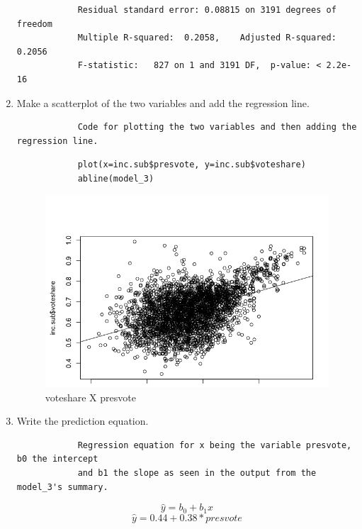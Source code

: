 \documentclass[12pt,letterpaper]{article}
\begin{document}
\begin{enumerate}
\begin{verbatim}
			Residual standard error: 0.08815 on 3191 degrees of freedom
			Multiple R-squared:  0.2058,	Adjusted R-squared:  0.2056
			F-statistic:   827 on 1 and 3191 DF,  p-value: < 2.2e-16
		\end{verbatim}
		\item Make a scatterplot of the two variables and add the regression line. 
		\begin{verbatim}
			Code for plotting the two variables and then adding the regression line.
		\end{verbatim}
		\begin{lstlisting}
			plot(x=inc.sub$presvote, y=inc.sub$voteshare)
			abline(model_3)
		\end{lstlisting}
		 \begin{figure}
			\vspace{-1cm}
			\includegraphics[width=15cm]{Rplot3.png}
			\caption{ voteshare X presvote}
		\end{figure}
		\item Write the prediction equation.
		\begin{verbatim}
			Regression equation for x being the variable presvote, b0 the intercept 
			and b1 the slope as seen in the output from the model_3's summary.
		\end{verbatim}
		\begin{equation}
			\hat{y} = b_0 + b_1x
		\end{equation}
		\begin{equation}
			\hat{y} = 0.44 + 0.38*presvote
		\end{equation}
	\end{enumerate}

\newpage	
\end{document}
